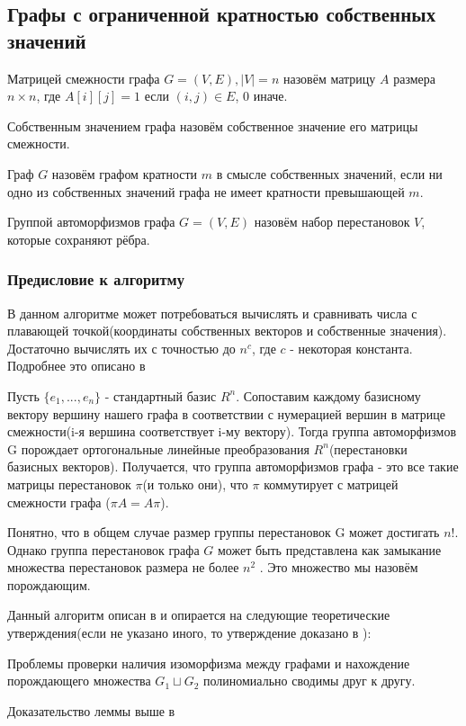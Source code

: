 \subsection{Графы с ограниченной кратностью собственных значений}

\begin{definition}
    Матрицей смежности графа $G=(V, E), |V|=n$ назовём матрицу $A$ размера $n \times n$, где $A[i][j] = 1$ если $(i, j) \in E$, 0 иначе.
\end{definition}
\begin{definition}
    Собственным значением графа назовём собственное значение его матрицы смежности.
\end{definition}
\begin{definition}
    Граф $G$ назовём графом кратности $m$ в смысле собственных значений, если ни одно из собственных значений графа не имеет кратности превышающей $m$.
\end{definition}
\begin{definition}
    Группой автоморфизмов графа $G=(V, E)$ назовём набор перестановок $V$, которые сохраняют рёбра.
\end{definition}

\subsubsection*{Предисловие к алгоритму}
    В данном алгоритме может потребоваться вычислять и сравнивать числа с плавающей точкой(координаты собственных векторов и собственные значения). Достаточно вычислять их с точностью до $n^c$, где $c$ - некоторая константа. Подробнее это описано в \cite{10}

    Пусть $\{e_1, ..., e_n\}$ - стандартный базис $R^n$. Сопоставим каждому базисному вектору вершину нашего графа в соответствии с нумерацией вершин в матрице смежности(i-я вершина соответствует i-му вектору). Тогда группа автоморфизмов G порождает ортогональные линейные преобразования $R^n$(перестановки базисных векторов). Получается, что группа автоморфизмов графа - это все такие матрицы перестановок $\pi$(и только они), что $\pi$ коммутирует с матрицей смежности графа ($\pi A = A \pi$).
    
    Понятно, что в общем случае размер группы перестановок G может достигать $n!$. Однако группа перестановок графа $G$ может быть представлена как замыкание множества перестановок размера не более $n^2$ \cite{9}. Это множество мы назовём порождающим.

Данный алгоритм описан в \cite{8} и опирается на следующие теоретические утверждения(если не указано иного, то утверждение доказано в \cite{8}):
\begin{lemma}
    Проблемы проверки наличия изоморфизма между графами и нахождение порождающего множества $G_1 \sqcup G_2$ полиномиально сводимы друг к другу.
\end{lemma}
Доказательство леммы выше в \cite{7}



